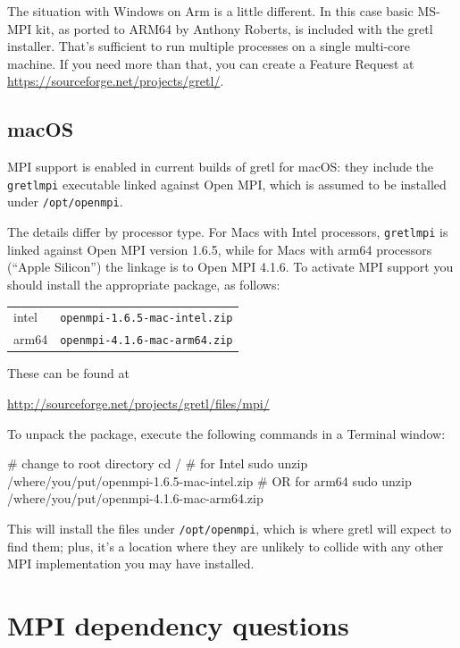 \documentclass{article}
\begin{document}
The situation with Windows on Arm is a little different. In this case
basic \textsf{MS-MPI} kit, as ported to ARM64 by Anthony Roberts, is
included with the gretl installer. That's sufficient to run multiple
processes on a single multi-core machine. If you need more than that,
you can create a Feature Request at
\url{https://sourceforge.net/projects/gretl/}.

\subsection{macOS}

MPI support is enabled in current builds of gretl for macOS: they
include the \texttt{gretlmpi} executable linked against \textsf{Open
  MPI}, which is assumed to be installed under
\texttt{/opt/openmpi}.

The details differ by processor type. For Macs with Intel processors,
\texttt{gretlmpi} is linked against \textsf{Open MPI} version 1.6.5, while
for Macs with arm64 processors (``Apple Silicon'') the linkage is to
\textsf{Open MPI} 4.1.6. To activate MPI support you should install the
appropriate package, as follows:

\begin{center}
\begin{tabular}{ll}
  intel & \texttt{openmpi-1.6.5-mac-intel.zip} \\
  arm64 & \texttt{openmpi-4.1.6-mac-arm64.zip}
\end{tabular}
\end{center}

These can be found at

\url{http://sourceforge.net/projects/gretl/files/mpi/}

To unpack the package, execute the following commands in a \textsf{Terminal}
window:
\begin{code}
# change to root directory
cd /
# for Intel
sudo unzip /where/you/put/openmpi-1.6.5-mac-intel.zip
# OR for arm64
sudo unzip /where/you/put/openmpi-4.1.6-mac-arm64.zip
\end{code}
%
This will install the files under \texttt{/opt/openmpi}, which is
where gretl will expect to find them; plus, it's a location where they
are unlikely to collide with any other MPI implementation you may have
installed.

\section{MPI dependency questions}
\label{sec:mpi-depend}
\end{document}
